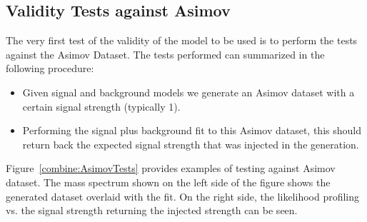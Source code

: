 \subsection{Validity Tests against Asimov}
The very first test of the validity of the model to be used is to perform the
tests against the Asimov Dataset. The tests performed can summarized in the
following procedure:

\begin{itemize}
    \item Given signal and background models we generate an Asimov dataset with
 a certain signal strength (typically 1).
    \item Performing the signal plus background fit to this Asimov dataset,
this should return back the expected signal strength that was injected in
the generation.
\end{itemize}

Figure~\ref{combine:AsimovTests} provides examples of testing against Asimov
dataset. The mass spectrum shown on the left side of the figure shows the
generated dataset overlaid with the fit. On the right side, the
likelihood profiling vs. the signal strength returning the injected strength
can be seen.

